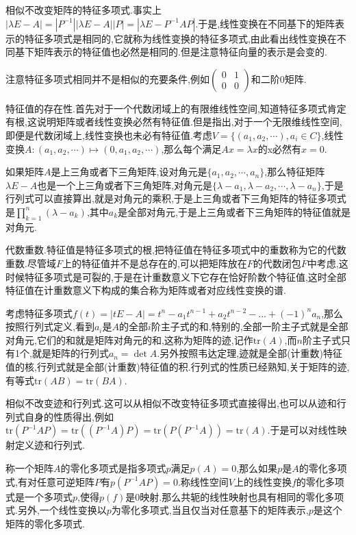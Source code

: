 相似不改变矩阵的特征多项式.事实上$|\lambda E-A|=|P^{-1}||\lambda E-A||P|=|\lambda E-P^{-1}AP|$.于是,线性变换在不同基下的矩阵表示的特征多项式是相同的,它就称为线性变换的特征多项式,由此看出线性变换在不同基下矩阵表示的特征值也必然是相同的.但是注意特征向量的表示是会变的.

注意特征多项式相同并不是相似的充要条件,例如$\left(\begin{array}{cc}
0&1\\
0&0
\end{array}\right)$和二阶0矩阵.

特征值的存在性.首先对于一个代数闭域上的有限维线性空间,知道特征多项式肯定有根,这说明矩阵或者线性变换必然有特征值.但是指出,对于一个无限维线性空间,即便是代数闭域上,线性变换也未必有特征值.考虑$V=\{(a_1,a_2,\cdots),a_i\in C\}$,线性变换$A:(a_1,a_2,\cdots)\mapsto (0,a_1,a_2,\cdots)$,那么每个满足$Ax=\lambda x$的x必然有$x=0$.

如果矩阵$A$是上三角或者下三角矩阵,设对角元是$\{a_1,a_2,\cdots,a_n\}$,那么特征矩阵$\lambda E-A$也是一个上三角或者下三角矩阵,对角元是$\{\lambda-a_1,\lambda-a_2,\cdots,\lambda-a_n\}$,于是行列式可以直接算出,就是对角元的乘积,于是上三角或者下三角矩阵的特征多项式是$\prod_{k=1}^{n}(\lambda-a_k)$,其中$a_k$是全部对角元,于是上三角或者下三角矩阵的特征值就是对角元.

代数重数.特征值是特征多项式的根,把特征值在特征多项式中的重数称为它的代数重数.尽管域$F$上的特征值并不是总存在的,可以把矩阵放在$F$的代数闭包$\overline{F}$中考虑,这时候特征多项式是可裂的,于是在计重数意义下它存在恰好阶数个特征值,这时全部特征值在计重数意义下构成的集合称为矩阵或者对应线性变换的谱.

考虑特征多项式$f(t)=|tE-A|=t^n-a_1t^ {n-1}+a_2t^{n-2}-...+(-1)^na_n$,那么按照行列式定义,看到$a_i$是$A$的全部$i$阶主子式的和,特别的,全部一阶主子式就是全部对角元,它们的和就是矩阵对角元的和,这称为矩阵的迹,记作$\mathrm{tr}(A)$,而$n$阶主子式只有1个,就是矩阵的行列式$a_n=\det A$.另外按照韦达定理,迹就是全部(计重数)特征值的核,行列式就是全部(计重数)特征值的积.行列式的性质已经熟知,关于矩阵的迹,有等式$\mathrm{tr}(AB)=\mathrm{tr}(BA)$.

相似不改变迹和行列式.这可以从相似不改变特征多项式直接得出,也可以从迹和行列式自身的性质得出,例如$\mathrm{tr}(P^{-1}AP)=\mathrm{tr}((P^{-1}A)P)=\mathrm{tr}(P(P^{-1}A))=\mathrm{tr}(A)$.于是可以对线性映射定义迹和行列式.

称一个矩阵$A$的零化多项式是指多项式$p$满足$p(A)=0$,那么如果$p$是$A$的零化多项式,有对任意可逆矩阵$P$有$p(P^{-1}AP)=0$.称线性空间$V$上的线性变换$f$的零化多项式是一个多项式$p$,使得$p(f)$是0映射.那么共轭的线性映射也具有相同的零化多项式.另外,一个线性变换以$p$为零化多项式,当且仅当对任意基下的矩阵表示,$p$是这个矩阵的零化多项式.

